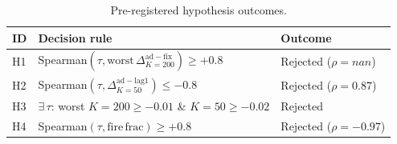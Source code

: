 \begin{table}[!t]
  \caption{Pre-registered hypothesis outcomes.}
  \label{tab:hypotheses}
  \centering
  \small
  \setlength{\tabcolsep}{4pt}
  \begin{tabular}{@{}p{0.5cm}p{4.7cm}p{2.1cm}@{}}
    \toprule
    \textbf{ID} & \textbf{Decision rule} & \textbf{Outcome} \\
    \midrule
    H1 & Spearman$(\tau, \mathrm{worst}\,\Delta^{\mathrm{ad-fix}}_{K=200})\geq +0.8$ & Rejected ($\rho=nan$) \\
    H2 & Spearman$(\tau, \Delta^{\mathrm{ad-lag1}}_{K=50})\leq -0.8$ & Rejected ($\rho=0.87$) \\
    H3 & $\exists\,\tau$: worst $K=200\geq -0.01$ \& $K=50\geq -0.02$ & Rejected \\
    H4 & Spearman$(\tau, \mathrm{fire\,frac})\geq +0.8$ & Rejected ($\rho=-0.97$) \\
    \bottomrule
  \end{tabular}
\end{table}
